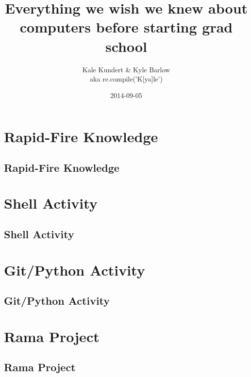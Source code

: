 \documentclass[xcolor=x11names,compress,aspectratio=43]{beamer}
\title[Bootcamp Hacking] %
{Everything we wish we knew about computers before starting grad school}
\author[] %
{Kale Kundert \& Kyle Barlow \\ aka re.compile('K[ya]le')}
\date[] %
{2014-09-05}
\renewcommand{\(}{\begin{columns}}
\renewcommand{\)}{\end{columns}}
\newcommand{\<}[1]{\begin{column}{#1}}
\renewcommand{\>}{\end{column}}
\begin{document}


\contourlength{2pt} %

\begin{frame}
 \titlepage
\end{frame}


\section{Rapid-Fire Knowledge}
\subsection{Rapid-Fire Knowledge}











\section{Shell Activity}
\subsection{Shell Activity}



\section{Git/Python Activity}
\subsection{Git/Python Activity}





\section{Rama Project}
\subsection{Rama Project}


\end{document}
